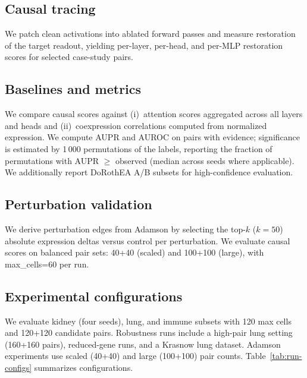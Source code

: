 \documentclass[10pt,letterpaper]{article}
\begin{document}
\subsection*{Causal tracing}

We patch clean activations into ablated forward passes and measure restoration
of the target readout, yielding per-layer, per-head, and per-MLP restoration
scores for selected case-study pairs.

\subsection*{Baselines and metrics}

We compare causal scores against (i)~attention scores aggregated across all
layers and heads and (ii)~coexpression correlations computed from normalized
expression. We compute AUPR and AUROC \cite{davis_prauc_2006} on pairs with
evidence; significance is
estimated by 1\,000 permutations of the labels, reporting the fraction of
permutations with AUPR $\geq$ observed (median across seeds where applicable).
We additionally report DoRothEA A/B subsets for high-confidence evaluation.

\subsection*{Perturbation validation}

We derive perturbation edges from Adamson \cite{adamson_cell_2016,adamson_dataverse_2022}
by selecting the top-$k$ ($k{=}50$) absolute expression deltas versus control per perturbation.
We evaluate causal scores on balanced pair sets: 40+40 (scaled) and 100+100 (large), with
max\_cells=60 per run.

\subsection*{Experimental configurations}

We evaluate kidney (four seeds), lung, and immune subsets with 120 max cells
and 120+120 candidate pairs. Robustness runs include a high-pair lung setting
(160+160 pairs), reduced-gene runs, and a Krasnow lung dataset. Adamson
experiments use scaled (40+40) and large (100+100) pair counts.
Table~\ref{tab:run-configs} summarizes configurations.
\end{document}
